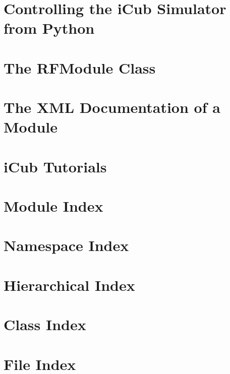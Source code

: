 \let\mypdfximage\pdfximage\def\pdfximage{\immediate\mypdfximage}\documentclass[twoside]{book}
\newcommand{\+}{\discretionary{\mbox{\scriptsize$\hookleftarrow$}}{}{}}
\begin{document}
\chapter{Controlling the i\+Cub Simulator from Python}
\label{icub_python_simworld_control}

\chapter{The RFModule Class}
\label{icub_tutorial_module}

\chapter{The XML Documentation of a Module}
\label{xml_module_documentation}

\chapter{i\+Cub Tutorials}
\label{md_icub_tutorials_README}

\chapter{Module Index}

\chapter{Namespace Index}

\chapter{Hierarchical Index}

\chapter{Class Index}

\chapter{File Index}

\end{document}
